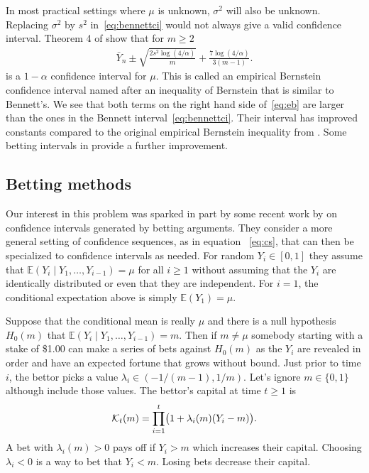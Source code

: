 \documentclass{article}
\newcommand{\art}[1]{\begingroup\color{blue}#1\endgroup}
\renewcommand{\ge}{\geqslant}
\newcommand{\e}{\mathbb{E}}
\newcommand{\giv}{\!\mid\!} %
\begin{document}
In most practical settings where $\mu$ is unknown,
$\sigma^2$ will also be unknown. Replacing $\sigma^2$
by $s^2$ in~\eqref{eq:bennettci} would not always
give a valid confidence interval.  
Theorem 4 of \cite{maurer2009empirical} show that
for $m\ge2$
\begin{align}\label{eq:eb}
    \bar Y_n\pm
\sqrt{\frac{2s^2\log(4/\alpha)}m}
+ \frac{7\log(4/\alpha)}{3(m-1)}.
\end{align}
is a $1-\alpha$ confidence interval for $\mu$.
This is called an empirical Bernstein confidence
interval named after an inequality of Bernstein
that is similar to Bennett's.  We see that both terms
on the right hand side of~\eqref{eq:eb} are larger
than the ones in the Bennett interval~\eqref{eq:bennettci}.
Their interval has improved constants compared to the original
empirical Bernstein inequality from
\cite{audi:muno:szep:2007}. Some betting intervals
in \cite{WauRam24a} provide a further improvement.





\subsection{Betting methods}

Our interest in this problem was sparked in part by some recent
work by \cite{WauRam24a} on confidence intervals generated
by betting arguments.  They consider a more general setting
of confidence sequences, as in equation ~\eqref{eq:cs}, 
that can then be specialized to confidence intervals as needed.  
For random $Y_i\in[0,1]$ they assume
that $\e(Y_i\giv Y_1,\dots,Y_{i-1})=\mu$ for all $i\ge1$ 
without assuming
that the $Y_i$ are identically distributed or even that
they are independent. For $i=1$, the conditional expectation 
above is simply $\e(Y_1)=\mu$.

Suppose that the conditional mean is really $\mu$ and 
there is a null hypothesis $H_0(m)$ that
$\e(Y_i\giv Y_1,\dots, Y_{i-1})=m$. Then if $m\ne\mu$
somebody starting with a stake of \$1.00 can
make a series of bets against $H_0(m)$
as the $Y_i$ are revealed in order
and have an expected fortune that grows without bound.
Just prior to time $i$, the bettor picks a value
$\lambda_i\in(-1/(m-1),1/m)$. Let's ignore $m\in\{0,1\}$
although \cite{WauRam24a} include those values. The bettor's
capital at time $t\ge1$ is
$$
\mathcal{K}_t(m)= \prod_{i=1}^t\bigl(1+\lambda_i(m)(Y_i-m)\bigr).
$$
A bet with $\lambda_i(m)>0$ pays off if $Y_i>m$ which
increases their capital. Choosing $\lambda_i<0$ is a 
way to bet that $Y_i<m$. \art{Losing bets decrease
their capital.}
\end{document}

